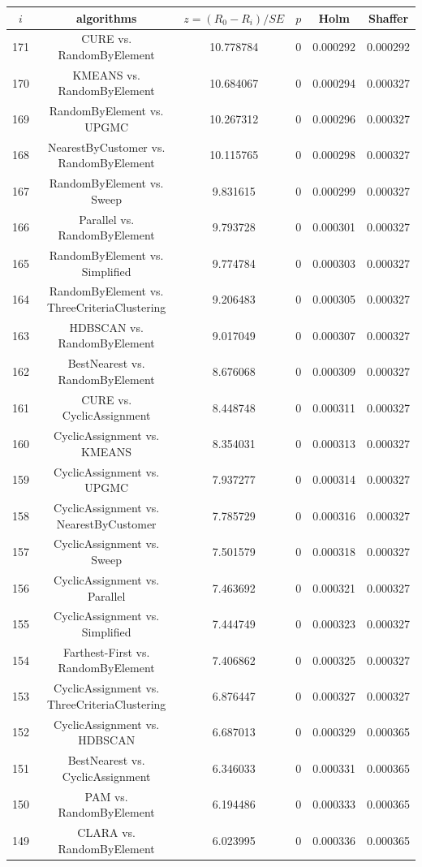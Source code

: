 \documentclass[a4paper,10pt]{article}
\begin{document}
\begin{landscape}
\begin{table}[!htp]
\centering\scriptsize
\begin{tabular}{cccccc}
$i$&algorithms&$z=(R_0 - R_i)/SE$&$p$&Holm&Shaffer\\
\hline171&CURE vs. RandomByElement&10.778784&0&0.000292&0.000292\\
170&KMEANS vs. RandomByElement&10.684067&0&0.000294&0.000327\\
169&RandomByElement vs. UPGMC&10.267312&0&0.000296&0.000327\\
168&NearestByCustomer vs. RandomByElement&10.115765&0&0.000298&0.000327\\
167&RandomByElement vs. Sweep&9.831615&0&0.000299&0.000327\\
166&Parallel vs. RandomByElement&9.793728&0&0.000301&0.000327\\
165&RandomByElement vs. Simplified&9.774784&0&0.000303&0.000327\\
164&RandomByElement vs. ThreeCriteriaClustering&9.206483&0&0.000305&0.000327\\
163&HDBSCAN vs. RandomByElement&9.017049&0&0.000307&0.000327\\
162&BestNearest vs. RandomByElement&8.676068&0&0.000309&0.000327\\
161&CURE vs. CyclicAssignment&8.448748&0&0.000311&0.000327\\
160&CyclicAssignment vs. KMEANS&8.354031&0&0.000313&0.000327\\
159&CyclicAssignment vs. UPGMC&7.937277&0&0.000314&0.000327\\
158&CyclicAssignment vs. NearestByCustomer&7.785729&0&0.000316&0.000327\\
157&CyclicAssignment vs. Sweep&7.501579&0&0.000318&0.000327\\
156&CyclicAssignment vs. Parallel&7.463692&0&0.000321&0.000327\\
155&CyclicAssignment vs. Simplified&7.444749&0&0.000323&0.000327\\
154&Farthest-First vs. RandomByElement&7.406862&0&0.000325&0.000327\\
153&CyclicAssignment vs. ThreeCriteriaClustering&6.876447&0&0.000327&0.000327\\
152&CyclicAssignment vs. HDBSCAN&6.687013&0&0.000329&0.000365\\
151&BestNearest vs. CyclicAssignment&6.346033&0&0.000331&0.000365\\
150&PAM vs. RandomByElement&6.194486&0&0.000333&0.000365\\
149&CLARA vs. RandomByElement&6.023995&0&0.000336&0.000365\\

\end{tabular}
\end{table}
\end{landscape}
\end{document}
